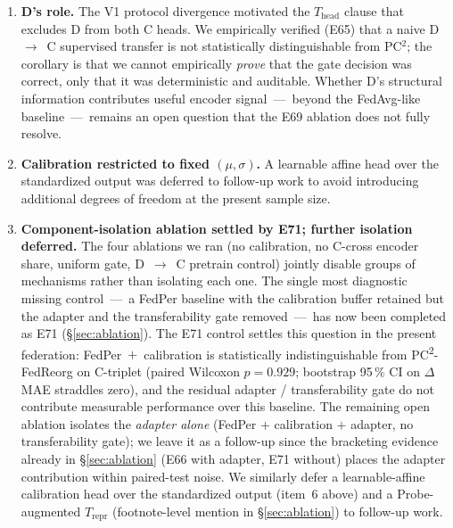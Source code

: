 \documentclass[11pt,a4paper]{article}
\newcommand{\PC}{PC\textsuperscript{2}-FedReorg}
\begin{document}
\begin{enumerate}
  \item \textbf{D's role.} The V1 protocol divergence motivated the $T_{\mathrm{head}}$ clause that excludes D from both C heads. We empirically verified (E65) that a naive D~$\to$~C supervised transfer is not statistically distinguishable from PC$^2$; the corollary is that we cannot empirically \emph{prove} that the gate decision was correct, only that it was deterministic and auditable. Whether D's structural information contributes useful encoder signal~---~beyond the FedAvg-like baseline~---~remains an open question that the E69 ablation does not fully resolve.

  \item \textbf{Calibration restricted to fixed $(\mu, \sigma)$.} A learnable affine head over the standardized output was deferred to follow-up work to avoid introducing additional degrees of freedom at the present sample size.

  \item \textbf{Component-isolation ablation settled by E71; further isolation deferred.} The four ablations we ran (no calibration, no C-cross encoder share, uniform gate, D~$\to$~C pretrain control) jointly disable groups of mechanisms rather than isolating each one. The single most diagnostic missing control~---~a FedPer baseline with the calibration buffer retained but the adapter and the transferability gate removed~---~has now been completed as E71 (\S\ref{sec:ablation}). The E71 control settles this question in the present federation: FedPer~$+$~calibration is statistically indistinguishable from \PC{} on C-triplet (paired Wilcoxon $p = 0.929$; bootstrap 95\,\% CI on $\Delta$MAE straddles zero), and the residual adapter / transferability gate do not contribute measurable performance over this baseline. The remaining open ablation isolates the \emph{adapter alone} (FedPer $+$ calibration $+$ adapter, no transferability gate); we leave it as a follow-up since the bracketing evidence already in \S\ref{sec:ablation} (E66 with adapter, E71 without) places the adapter contribution within paired-test noise. We similarly defer a learnable-affine calibration head over the standardized output (item~6 above) and a Probe-augmented $T_{\mathrm{repr}}$ (footnote-level mention in \S\ref{sec:ablation}) to follow-up work.


\end{enumerate}
\end{document}
